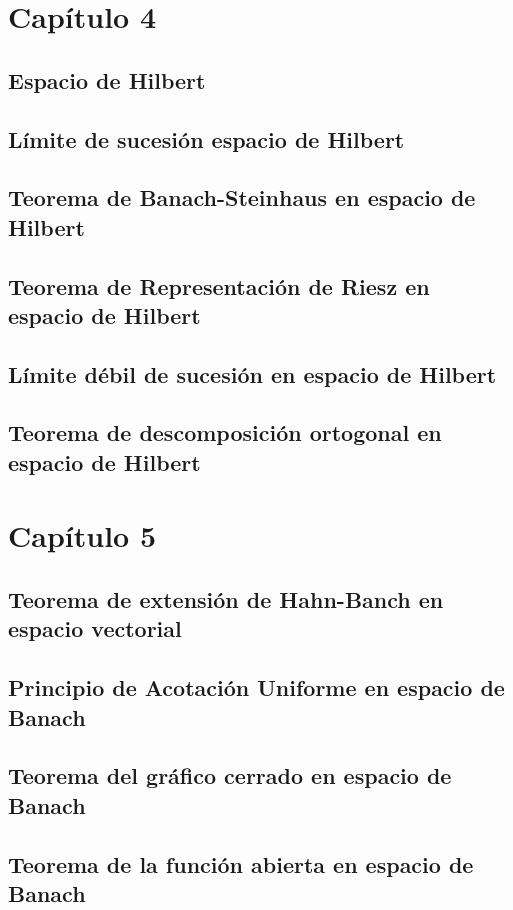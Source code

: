 \documentclass[a4paper]{scrbook}
\theoremstyle{definition}
\begin{document}
\chapter{Capítulo 4}
\section{Espacio de Hilbert}
\section{Límite de sucesión espacio de Hilbert}
\section{Teorema de Banach-Steinhaus en espacio de Hilbert}
\section{Teorema de Representación de Riesz en espacio de Hilbert}
\section{Límite débil de sucesión en espacio de Hilbert}
\section{Teorema de descomposición ortogonal en espacio de Hilbert}

\chapter{Capítulo 5}
\section{Teorema de extensión de Hahn-Banch en espacio vectorial}
\section{Principio de Acotación Uniforme en espacio de Banach}
\section{Teorema del gráfico cerrado en espacio de Banach}
\section{Teorema de la función abierta en espacio de Banach}
\end{document}
